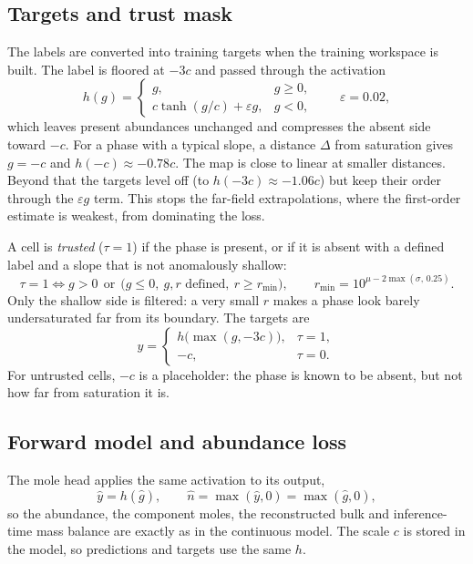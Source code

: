 \documentclass[11pt]{article}
\begin{document}
\subsection{Targets and trust mask}

The labels are converted into training targets when the training workspace is built. The
label is floored at $-3c$ and passed through the activation
\begin{equation}
  h(g) = \begin{cases} g, & g \ge 0,\\ c\tanh(g/c) + \varepsilon g, & g < 0, \end{cases}
  \qquad \varepsilon = 0.02,
  \label{eq:h}
\end{equation}
which leaves present abundances unchanged and compresses the absent side toward $-c$.
For a phase with a typical slope, a distance $\Delta$ from saturation gives $g = -c$ and
$h(-c) \approx -0.78c$. The map is close to linear at smaller distances. Beyond that the
targets level off (to $h(-3c) \approx -1.06c$) but keep their order through the
$\varepsilon g$ term. This stops the far-field extrapolations, where the first-order estimate
is weakest, from dominating the loss.

A cell is \emph{trusted} ($\tau = 1$) if the phase is present, or if it is absent with a
defined label and a slope that is not anomalously shallow:
\begin{equation}
  \tau = 1 \iff g > 0 \ \ \text{or}\ \ \big(g \le 0,\ g,r \text{ defined},\ r \ge r_{\min}\big),
  \qquad r_{\min} = 10^{\mu - 2\max(\sigma,\,0.25)}.
\end{equation}
Only the shallow side is filtered: a very small $r$ makes a phase look barely undersaturated
far from its boundary. The targets are
\begin{equation}
  y = \begin{cases} h\big(\max(g, -3c)\big), & \tau = 1,\\ -c, & \tau = 0. \end{cases}
\end{equation}
For untrusted cells, $-c$ is a placeholder: the phase is known to be absent, but not how far
from saturation it is.

\subsection{Forward model and abundance loss}

The mole head applies the same activation to its output,
\begin{equation}
  \hat y = h(\hat g), \qquad \hat n = \max(\hat y, 0) = \max(\hat g, 0),
\end{equation}
so the abundance, the component moles, the reconstructed bulk and inference-time mass
balance are exactly as in the continuous model. The scale $c$ is stored in the model, so
predictions and targets use the same $h$.
\end{document}
